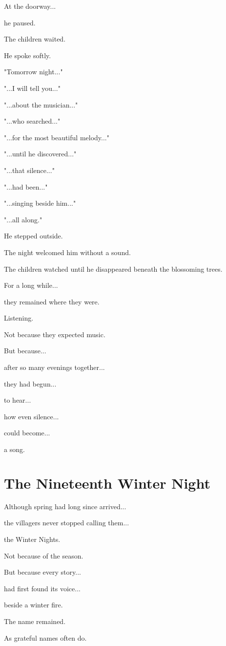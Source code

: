 \documentclass[12pt,openany]{book}
\begin{document}
At the doorway...

he paused.

The children waited.

He spoke softly.

"Tomorrow night..."

"...I will tell you..."

"...about the musician..."

"...who searched..."

"...for the most beautiful melody..."

"...until he discovered..."

"...that silence..."

"...had been..."

"...singing beside him..."

"...all along."

He stepped outside.

The night welcomed him without a sound.

The children watched until he disappeared beneath the blossoming trees.

For a long while...

they remained where they were.

Listening.

Not because they expected music.

But because...

after so many evenings together...

they had begun...

to hear...

how even silence...

could become...

a song.
\chapter{The Nineteenth Winter Night}

Although spring had long since arrived...

the villagers never stopped calling them...

the Winter Nights.

Not because of the season.

But because every story...

had first found its voice...

beside a winter fire.

The name remained.

As grateful names often do.
\end{document}
